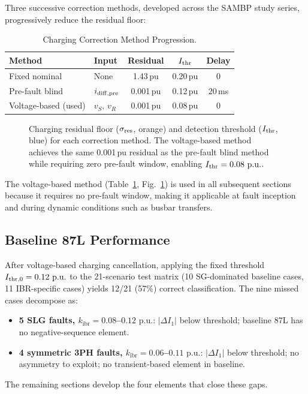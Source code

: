 \documentclass[journal,twoside,10pt]{IEEEtran}
\newcommand{\kibr}{k_{\mathrm{ibr}}}
\newcommand{\pu}{\,\text{p.u.}}
\begin{document}
Three successive correction methods, developed across the SAMBP study
series, progressively reduce the residual floor:

\begin{table}[!t]
\centering
\caption{Charging Correction Method Progression.}
\label{tab:corrections}
\renewcommand{\arraystretch}{1.05}
\begin{tabular}{llccc}
\toprule
Method & Input & Residual & $I_{\rm thr}$ & Delay \\
\midrule
Fixed nominal        & None               & 1.43\,pu & 0.20\,pu & 0 \\
Pre-fault blind      & $i_{\rm diff,pre}$ & 0.001\,pu & 0.12\,pu & 20\,ms \\
Voltage-based (used) & $v_S,\,v_R$        & 0.001\,pu & 0.08\,pu & 0 \\
\bottomrule
\end{tabular}
\end{table}

\begin{figure}[!t]
  \centering
  
  \caption{Charging residual floor ($\sigma_{\rm res}$, orange) and
           detection threshold ($I_{\rm thr}$, blue) for each correction
           method.  The voltage-based method achieves the same 0.001\,pu
           residual as the pre-fault blind method while requiring zero
           pre-fault window, enabling $I_{\rm thr} = 0.08\,\pu$.}
  \label{fig:residual}
\end{figure}

The voltage-based method (Table~\ref{tab:corrections}, Fig.~\ref{fig:residual})
is used in all subsequent sections because it requires no pre-fault window,
making it applicable at fault inception and during dynamic conditions such as
busbar transfers.

\subsection{Baseline 87L Performance}
\label{sec:baseline}

After voltage-based charging cancellation, applying the fixed threshold
$I_{\rm thr,0} = 0.12\,\pu$ to the 21-scenario test matrix
(10 SG-dominated baseline cases, 11 IBR-specific cases) yields 12/21 (57\%)
correct classification.  The nine missed cases decompose as:
\begin{itemize}
  \item \textbf{5 SLG faults, $\kibr = 0.08$--$0.12\,\pu$}: $|\Delta I_1|$
        below threshold; baseline 87L has no negative-sequence element.
  \item \textbf{4 symmetric 3PH faults, $\kibr = 0.06$--$0.11\,\pu$}:
        $|\Delta I_1|$ below threshold; no asymmetry to exploit;
        no transient-based element in baseline.
\end{itemize}
The remaining sections develop the four elements that close these gaps.
\end{document}

